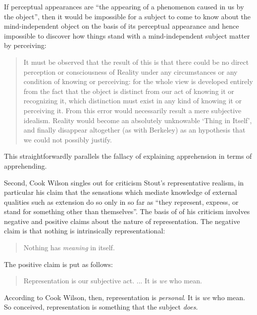 If perceptual appearances are ``the appearing of a phenomenon caused in us by the object'', then it would be impossible for a subject to come to know about the mind-independent object on the basis of its perceptual appearance and hence impossible to discover how things stand with a mind-independent subject matter by perceiving:
\begin{quote}
	It must be observed that the result of this is that there could be no direct perception or consciousness of Reality under any circumstances or any condition of knowing or perceiving: for the whole view is developed entirely from the fact that the object is distinct from our act of knowing it or recognizing it, which distinction must exist in any kind of knowing it or perceiving it. From this error would necessarily result a mere subjective idealism. Reality would become an absolutely unknowable `Thing in Itself', and finally disappear altogether (as with Berkeley) as an hypothesis that we could not possibly justify. \citep[797]{Cook-Wilson:1926sf}
\end{quote}
This straightforwardly parallels the fallacy of explaining apprehension in terms of apprehending. 

Second, Cook Wilson singles out for criticism Stout’s representative realism, in particular his claim that the sensations which mediate knowledge of external qualities such as extension do so only in so far as ``they represent, express, or stand for something other than themselves''. The basis of of his criticism involves negative and positive claims about the nature of representation. The negative claim is that nothing is intrinsically representational:
\begin{quote}
	Nothing has \emph{meaning} in itself. \citep[]{Cook-Wilson:1926sf}
\end{quote}
The positive claim is put as follows: 
\begin{quote}
	Representation is our subjective act. ... It is \emph{we} who mean.  \citep[]{Cook-Wilson:1926sf}
\end{quote}
According to Cook Wilson, then, representation is \emph{personal}. It is \emph{we} who mean. So conceived, representation is something that the subject \emph{does}. 

